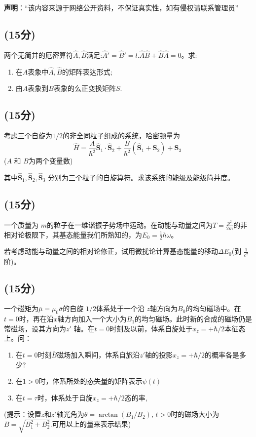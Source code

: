 
\textbf{声明}：“该内容来源于网络公开资料，不保证真实性，如有侵权请联系管理员”

\subsection{(15分)}
两个无简并的厄密算符$\hat{A},\hat{B}$满足:$\hat{A}'=\hat{B}'=l$.$\hat{A}\hat{B}+\hat{B}\hat{A}=0$。求:
\begin{enumerate}
\item 在$A$表象中$\hat{A},\hat{B}$的矩阵表达形式;
\item 由$A$表象到$B$表象的么正变换矩阵$S$.
\end{enumerate}
\subsection{(15分)}
考虑三个自旋为$1/2$的非全同粒子组成的系统，哈密顿量为$$\hat{H} = \frac{A}{\hbar^2} \hat{\mathbf{S}}_1 \cdot \hat{\mathbf{S}}_2 + \frac{B}{\hbar^2} (\hat{\mathbf{S}}_1  + \hat{\mathbf{S}}_2)+\hat{\mathbf{S}}_3~$$ ($A$ 和 $B$为两个变量数)

其中$\hat{\mathbf{S}}_1, \hat{\mathbf{S}}_2, \hat{\mathbf{S}}_3$ 分别为三个粒子的自旋算符。求该系统的能级及能级简并度。
\subsection{(15分)}
 一个质量为 $m$的粒子在一维谐振子势场中运动。在动能与动量之间为$T = \frac{p^2}{2m}$的非相对论极限下，其基态能量我们所熟知的，为$E_0 = \frac{1}{2}\hbar\omega$。

若考虑动能与动量之间的相对论修正，试用微扰论计算基态能量的移动$\Delta E_0$(到 $\frac{1}{c^2}$阶)。
\subsection{(15分)}
一个磁矩为$\overline{\mu} = \mu_0 \overline{\sigma}$的自旋 $1/2$体系处于一个沿 $z$轴方向为$B_0$的均匀磁场中。在$t=0$时，再在沿$x$轴方向加入一个大小为$B_1$的均匀磁场。此时新的合成的磁场仍是常磁场，设其方向为$z'$ 轴。在$t=0$时刻及以前，体系自旋处于$x_{z} = +\hbar/2$本征态上。问：
\begin{enumerate}
\item 在$t=0$时刻$\overline{B}$磁场加入瞬间，体系自旅沿$z'$轴的投影$x_{z} = +\hbar/2$的概率各是多少?
\item 在$1>0$时，体系所处的态失量的矩阵表示$\psi(t)$
\item 在$t=\tau$时，体系处于自旋$x_{z} = +\hbar/2$态的率,
\end{enumerate}
(提示：设置$z$和$z'$轴光角为$\theta = \arctan(B_1/B_2)$, $t > 0$时的磁场大小为$B = \sqrt{B_1^2 + B_2^2}.$可用以上的量来表示结果)